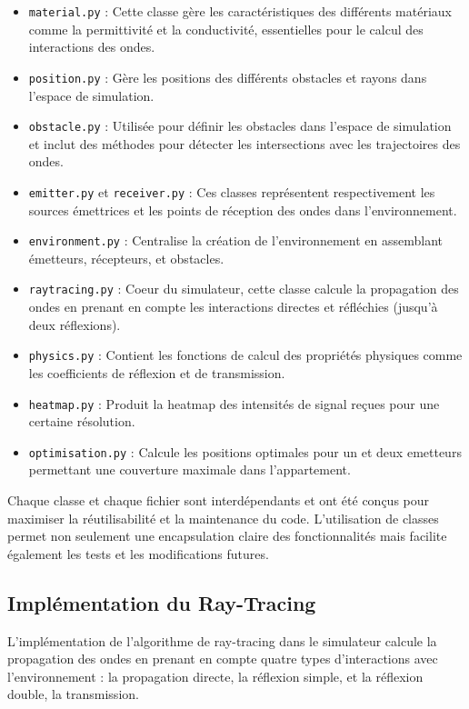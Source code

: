 \begin{itemize}
    \item \texttt{material.py} : Cette classe gère les caractéristiques des différents matériaux comme la permittivité et la conductivité, essentielles pour le calcul des interactions des ondes.
    \item \texttt{position.py} : Gère les positions des différents obstacles et rayons dans l'espace de simulation.%
    \item \texttt{obstacle.py} : Utilisée pour définir les obstacles dans l'espace de simulation et inclut des méthodes pour détecter les intersections avec les trajectoires des ondes.
    \item \texttt{emitter.py} et \texttt{receiver.py} : Ces classes représentent respectivement les sources émettrices et les points de réception des ondes dans l'environnement.
    \item \texttt{environment.py} : Centralise la création de l'environnement en assemblant émetteurs, récepteurs, et obstacles.
    \item \texttt{raytracing.py} : Coeur du simulateur, cette classe calcule la propagation des ondes en prenant en compte les interactions directes et réfléchies (jusqu'à deux réflexions).
    \item \texttt{physics.py} : Contient les fonctions de calcul des propriétés physiques comme les coefficients de réflexion et de transmission.
    \item \texttt{heatmap.py} : Produit la heatmap des intensités de signal reçues pour une certaine résolution.
    \item \texttt{optimisation.py} : Calcule les positions optimales pour un et deux emetteurs permettant une couverture maximale dans l'appartement.
\end{itemize}

Chaque classe et chaque fichier sont interdépendants et ont été conçus pour maximiser la réutilisabilité et la maintenance du code. L'utilisation de classes permet non seulement une encapsulation claire des fonctionnalités mais facilite également les tests et les modifications futures.

\subsection{Implémentation du Ray-Tracing}
L'implémentation de l'algorithme de ray-tracing dans le simulateur calcule la propagation des ondes en prenant en compte quatre types d'interactions avec l'environnement : la propagation directe, la réflexion simple, et la réflexion double, la transmission.

